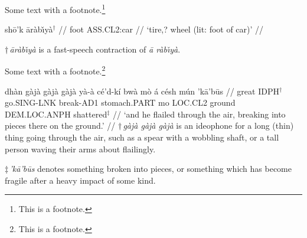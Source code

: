 \bye
Some text with a footnote.\footnote{This is a footnote.}

\ex
\begingl
\gla sh\=o'k \=ar\`ab{\v\i}y\`a$^{\dag}$ //
\glb foot {\sc ASS.CL2}:car //
\glft `tire,? wheel (lit: foot of car)' //
\endgl

\medskip
$\dag\,${\sl \=ar\`ab{\v\i}y\`a\/} is a fast-speech contraction of
{\sl \=a r\`ab{\v\i}y\`a}.
\xe

Some text with a footnote.\footnote{This is a footnote.}

\ex
\begingl
{} dh\`an {g\`aj\`a g\`aj\`a g\`aj\`a} y\`a-\`a c\'e'd-k{\'i} bw\`a
m\`o \'a c\'esh m\'un 'k\=a'b\=us //
 great {\sc IDPH}$^{\dag}$ go.{\sc SING}-{\sc LNK}
break-{\sc AD1} stomach.{\sc PART} {\sc mo} {\sc LOC.CL2} ground
{\sc DEM.LOC.ANPH} shattered$^{\ddag}$ //
\glft `and he flailed through the air, breaking into pieces there on the
ground.' //
\endgl
\medskip
\footnotesize
$\dag\,${\sl g\`aj\`a g\`aj\`a g\`aj\`a\/} is an ideophone for a long (thin)
thing going through the air, such as a spear with a wobbling shaft, or a tall
person waving their arms about flailingly.

$\ddag\,${\sl 'k\=a'b\=us\/} denotes something broken into pieces, or something
which has become fragile after a heavy impact of some kind.
\xe

